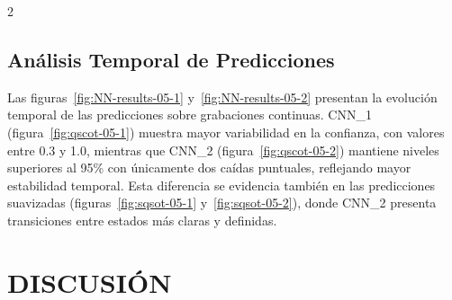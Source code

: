 \documentclass[12pt]{report}
\newenvironment{tightmulticols}{%
  \begin{multicols}{2}
  \setlength{\parskip}{1.2pt}
  \linespread{1}\selectfont
}{%
  \end{multicols}
}
\begin{document}
\begin{tightmulticols}

\section{Análisis Temporal de Predicciones}

\noindent Las figuras~\ref{fig:NN-results-05-1} y~\ref{fig:NN-results-05-2} presentan la evolución temporal de las predicciones sobre grabaciones continuas. CNN\_1 (figura~\ref{fig:qscot-05-1}) muestra mayor variabilidad en la confianza, con valores entre 0.3 y 1.0, mientras que CNN\_2 (figura~\ref{fig:qscot-05-2}) mantiene niveles superiores al 95\% con únicamente dos caídas puntuales, reflejando mayor estabilidad temporal. Esta diferencia se evidencia también en las predicciones suavizadas (figuras~\ref{fig:sqsot-05-1} y~\ref{fig:sqsot-05-2}), donde CNN\_2 presenta transiciones entre estados más claras y definidas.

\end{tightmulticols}


\pagebreak
\chapter{DISCUSIÓN}
\vspace{-3em}
\end{document}
